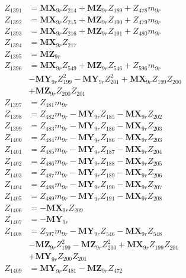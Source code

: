 \begin{multicols}{2}
\begin{align}
Z_{1391} &= \mathbf{MX}_{9r}Z_{214} + \mathbf{MZ}_{9r}Z_{189} + Z_{478}m_{9r} \nonumber \\
Z_{1392} &= \mathbf{MX}_{9r}Z_{215} + \mathbf{MZ}_{9r}Z_{190} + Z_{479}m_{9r} \nonumber \\
Z_{1393} &= \mathbf{MX}_{9r}Z_{216} + \mathbf{MZ}_{9r}Z_{191} + Z_{480}m_{9r} \nonumber \\
Z_{1394} &= \mathbf{MX}_{9r}Z_{217} \nonumber \\
Z_{1395} &= \mathbf{MZ}_{9r} \nonumber \\
Z_{1396} &= \mathbf{MX}_{9r}Z_{549} + \mathbf{MZ}_{9r}Z_{546} + Z_{596}m_{9r}  \nonumber \\
&- \mathbf{MY}_{9r}Z_{199}^2 - \mathbf{MY}_{9r}Z_{201}^2 + \mathbf{MX}_{9r}Z_{199}Z_{200}  \nonumber \\
&+ \mathbf{MZ}_{9r}Z_{200}Z_{201} \nonumber \\
Z_{1397} &= Z_{481}m_{9r} \nonumber \\
Z_{1398} &= Z_{482}m_{9r} - \mathbf{MY}_{9r}Z_{185} - \mathbf{MX}_{9r}Z_{202} \nonumber \\
Z_{1399} &= Z_{483}m_{9r} - \mathbf{MY}_{9r}Z_{186} - \mathbf{MX}_{9r}Z_{203} \nonumber \\
Z_{1400} &= Z_{484}m_{9r} - \mathbf{MY}_{9r}Z_{186} - \mathbf{MX}_{9r}Z_{203} \nonumber \\
Z_{1401} &= Z_{485}m_{9r} - \mathbf{MY}_{9r}Z_{187} - \mathbf{MX}_{9r}Z_{204} \nonumber \\
Z_{1402} &= Z_{486}m_{9r} - \mathbf{MY}_{9r}Z_{188} - \mathbf{MX}_{9r}Z_{205} \nonumber \\
Z_{1403} &= Z_{487}m_{9r} - \mathbf{MY}_{9r}Z_{189} - \mathbf{MX}_{9r}Z_{206} \nonumber \\
Z_{1404} &= Z_{488}m_{9r} - \mathbf{MY}_{9r}Z_{190} - \mathbf{MX}_{9r}Z_{207} \nonumber \\
Z_{1405} &= Z_{489}m_{9r} - \mathbf{MY}_{9r}Z_{191} - \mathbf{MX}_{9r}Z_{208} \nonumber \\
Z_{1406} &= -\mathbf{MX}_{9r}Z_{209} \nonumber \\
Z_{1407} &= -\mathbf{MY}_{9r} \nonumber \\
Z_{1408} &= Z_{597}m_{9r} - \mathbf{MY}_{9r}Z_{546} - \mathbf{MX}_{9r}Z_{548}  \nonumber \\
&- \mathbf{MZ}_{9r}Z_{199}^2 - \mathbf{MZ}_{9r}Z_{200}^2 + \mathbf{MX}_{9r}Z_{199}Z_{201}  \nonumber \\
&+ \mathbf{MY}_{9r}Z_{200}Z_{201} \nonumber \\
Z_{1409} &= \mathbf{MY}_{9r}Z_{481} - \mathbf{MZ}_{9r}Z_{472} \nonumber \\

\end{align}
\end{multicols}

